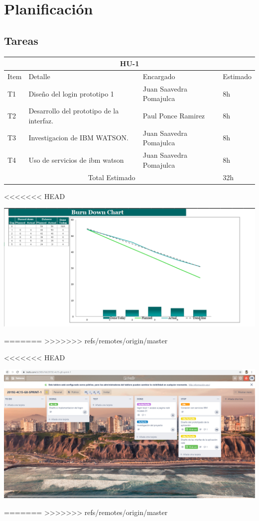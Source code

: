 \chapter{Planificación}
\section{Tareas}
\begin{table}[htbp]
	\begin{center}
		\begin{tabular}{| p{0.7cm} | p{10cm} | p{3.2cm} | p{1.8cm}|}
			\hline
			\multicolumn{4}{|c|}{HU-1}\\
			\hline
			Item & Detalle & Encargado & Estimado \\
			\hline
			T1 &Diseño del login prototipo 1 & Juan Saavedra Pomajulca & 8h \\
			\hline
			T2 & Desarrollo del prototipo de la interfaz. & Paul Ponce Ramirez & 8h \\
			\hline
			T3 & Investigacion de IBM WATSON. & Juan Saavedra Pomajulca & 8h \\
			\hline
			T4 & Uso de servicios de ibm watson & Juan Saavedra Pomajulca & 8h \\
			\hline
			\multicolumn{3}{|c|}{Total Estimado} & 32h\\
			\hline
		\end{tabular}
	\end{center}
\end{table}
<<<<<<< HEAD

\centering
	\includegraphics[width=1.20\textwidth]{img/burnt}\par\vspace{1cm}
	\vspace{0.30cm}	



=======
>>>>>>> refs/remotes/origin/master

<<<<<<< HEAD

\centering
\includegraphics[width=1.20\textwidth]{img/image}\par\vspace{1cm}
\vspace{0.30cm}	



=======
>>>>>>> refs/remotes/origin/master

